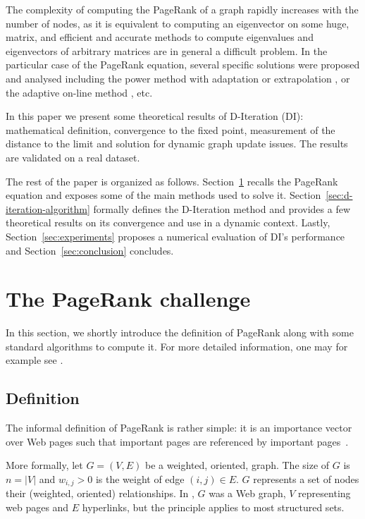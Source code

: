 \documentclass{llncs}
\begin{document}
The complexity of computing the PageRank of a graph rapidly increases with the number of nodes, as it is equivalent to computing an eigenvector on some huge, matrix, and efficient and accurate methods to compute eigenvalues and eigenvectors of arbitrary matrices are in general a difficult problem. In the particular case of the PageRank equation, several specific solutions were proposed and analysed \cite{LM04,BM05} including the power method \cite{BP99} with adaptation \cite{ST03} or extrapolation \cite{TS03,CG03}, or the adaptive on-line method \cite{AP03}, etc.

In this paper we present some theoretical results of D-Iteration (DI): mathematical definition, convergence to the fixed point, measurement of the distance to the limit and solution for dynamic graph update issues. The results are validated on a real dataset.




The rest of the paper is organized as follows. Section~\ref{sec:the-pagerank-challenge} recalls the PageRank equation and exposes some of the main methods used to solve it. Section~\ref{sec:d-iteration-algorithm} formally defines the D-Iteration method and provides a few theoretical results on its convergence and use in a dynamic context.
Lastly, Section~\ref{sec:experiments} proposes a numerical evaluation of DI's performance and Section~\ref{sec:conclusion} concludes.


\section{The PageRank challenge}\label{sec:the-pagerank-challenge}


In this section, we shortly introduce the definition of PageRank along with some standard algorithms to compute it. For more detailed information, one may for example see \cite{LM04}.

\subsection{Definition}

The informal definition of PageRank is rather simple: it is an importance vector over Web pages such that important pages are referenced by important pages~\cite{BP98}.


More formally, let $ G=(V,E) $ be a weighted, oriented, graph. The size of $ G $ is $ n=|V|$ and $ w_{i,j}>0 $ is the weight of edge $ (i,j)\in E $.
$ G $ represents a set of nodes their (weighted, oriented) relationships. In \cite{BP98}, $ G $ was a Web graph, $ V $ representing web pages and $ E $ hyperlinks, but the principle applies to most structured sets.
\end{document}
